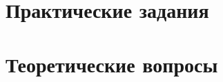 \documentclass[a4paper,oneside,14pt]{extarticle}
\begin{document}

\setcounter{page}{2}
\renewcommand{\contentsname}{СОДЕРЖАНИЕ}


\newpage
\section{Практические задания}

\newpage
\section{Теоретические вопросы}

\end{document}
